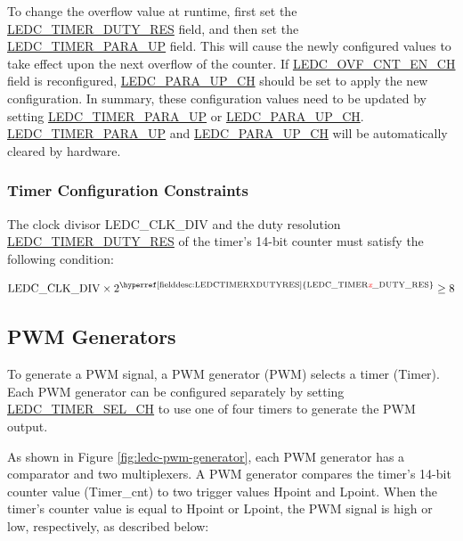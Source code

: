 \documentclass[main\_\_EN.tex]{subfiles}
\begin{document}
To change the overflow value at runtime, first set the \hyperref[fielddesc:LEDCTIMERXDUTYRES]{LEDC\_TIMER\_DUTY\_RES} field, and then set the\\ \hyperref[fielddesc:LEDCTIMERXPARAUP]{LEDC\_TIMER\_PARA\_UP} field. This will cause the newly configured values to take effect upon the next overflow of the counter. If \hyperref[fielddesc:LEDCOVFCNTENCHN]{LEDC\_OVF\_CNT\_EN\_CH} field is reconfigured, \hyperref[fielddesc:LEDCPARAUPCHN]{LEDC\_PARA\_UP\_CH} should be set to apply the new configuration. In summary, these configuration values need to be updated by setting \hyperref[fielddesc:LEDCTIMERXPARAUP]{LEDC\_TIMER\_PARA\_UP} or \hyperref[fielddesc:LEDCPARAUPCHN]{LEDC\_PARA\_UP\_CH}. \hyperref[fielddesc:LEDCTIMERXPARAUP]{LEDC\_TIMER\_PARA\_UP} and \hyperref[fielddesc:LEDCPARAUPCHN]{LEDC\_PARA\_UP\_CH} will be automatically cleared by hardware.

\subsubsection{Timer Configuration Constraints}

The clock divisor LEDC\_CLK\_DIV and the duty resolution \hyperref[fielddesc:LEDCTIMERXDUTYRES]{LEDC\_TIMER\_DUTY\_RES} of the timer's 14-bit counter must satisfy the following condition:

\begin{equation}
    {\textrm{LEDC\_CLK\_DIV} \times 2^{\textrm{\hyperref[fielddesc:LEDCTIMERXDUTYRES]{LEDC\_TIMER\regindex{x}\_DUTY\_RES}}}} \ge 8
\end{equation}

\subsection{PWM Generators}\label{sec:ledc-pwm-generator}
To generate a PWM signal, a PWM generator (PWM) selects a timer (Timer). Each PWM generator can be configured separately by setting \hyperref[fielddesc:LEDCTIMERSELCHN]{LEDC\_TIMER\_SEL\_CH} to use one of four timers to generate the PWM output.

As shown in Figure \ref{fig:ledc-pwm-generator}, each PWM generator has a comparator and two multiplexers. A PWM generator compares the timer's 14-bit counter value (Timer\_cnt) to two trigger values Hpoint and Lpoint. When the timer's counter value is equal to Hpoint or Lpoint, the PWM signal is high or low, respectively, as described below:
\end{document}
